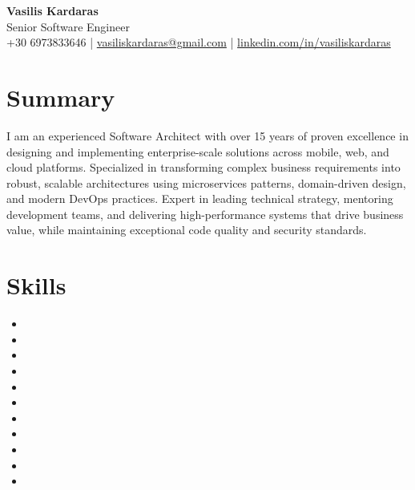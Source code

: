 \documentclass{mycv}
\begin{document}
\begin{center}
    {\LARGE\bfseries Vasilis Kardaras}\\
    {\large Senior Software Engineer}\\
    +30 6973833646 \enspace|\enspace
    \href{mailto:vasiliskardaras@gmail.com}{vasiliskardaras@gmail.com}
    \enspace|\enspace
    \href{https://linkedin.com/in/vasiliskardaras}
    {linkedin.com/in/vasiliskardaras}
\end{center}

\section*{Summary}
\vspace{0.5em}
I am an experienced Software Architect with over 15 years of proven excellence in designing and implementing enterprise-scale solutions
across mobile, web, and cloud platforms. Specialized in transforming complex business requirements into robust, scalable
architectures using microservices patterns, domain-driven design, and modern DevOps practices. Expert in leading technical
strategy, mentoring development teams, and delivering high-performance systems that drive business value, while maintaining
exceptional code quality and security standards.

\section*{Skills}

\begin{itemize}[itemsep=2pt]
\item {}
\item {}
\item {}
\item {}
\item {}
\item {}
\item {}
\item {}
\item {}
\item {}
\item {}
\end{itemize}
\end{document}
